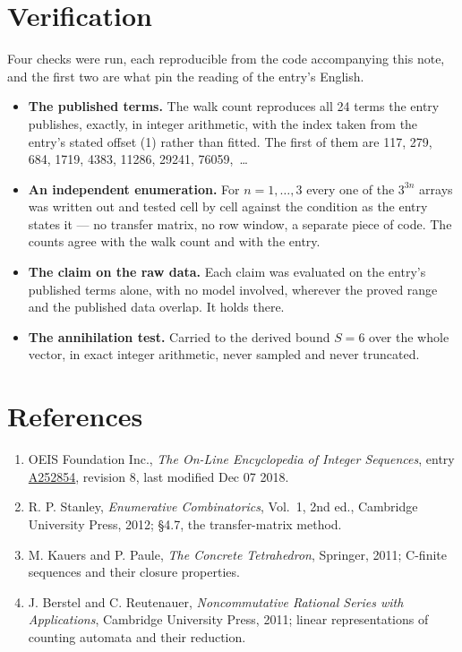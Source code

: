 \documentclass[11pt]{article}
\theoremstyle{definition}
\begin{document}
\section{Verification}

Four checks were run, each reproducible from the code accompanying this note, and the first two are what pin the reading of the entry's English.

\begin{itemize}

\item {\bfseries The published terms.} The walk count reproduces all 24 terms the entry publishes, exactly, in integer arithmetic, with the index taken from the entry's stated offset (1) rather than fitted. The first of them are 117, 279, 684, 1719, 4383, 11286, 29241, 76059,~\dots

\item {\bfseries An independent enumeration.} For $n = 1,\dots,3$ every one of the $3^{3n}$ arrays was written out and tested cell by cell against the condition as the entry states it --- no transfer matrix, no row window, a separate piece of code. The counts agree with the walk count and with the entry.

\item {\bfseries The claim on the raw data.} Each claim was evaluated on the entry's published terms alone, with no model involved, wherever the proved range and the published data overlap. It holds there.

\item {\bfseries The annihilation test.} Carried to the derived bound $S = 6$ over the whole vector, in exact integer arithmetic, never sampled and never truncated.

\end{itemize}

\section{References}

\begin{enumerate}

\item OEIS Foundation Inc., \emph{The On-Line Encyclopedia of Integer Sequences}, entry \href{https://oeis.org/A252854}{A252854}, revision 8, last modified Dec 07 2018.

\item R. P. Stanley, \emph{Enumerative Combinatorics}, Vol.~1, 2nd ed., Cambridge University Press, 2012; \S4.7, the transfer-matrix method.

\item M. Kauers and P. Paule, \emph{The Concrete Tetrahedron}, Springer, 2011; C-finite sequences and their closure properties.

\item J. Berstel and C. Reutenauer, \emph{Noncommutative Rational Series with Applications}, Cambridge University Press, 2011; linear representations of counting automata and their reduction.

\end{enumerate}
\end{document}
